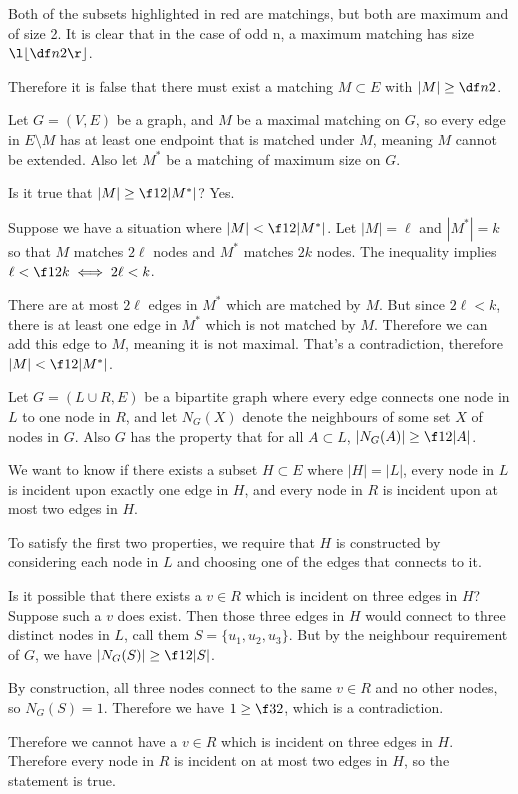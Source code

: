 \documentclass[a4paper]{article}
\begin{document}
Both of the subsets highlighted in red are matchings, but both are maximum and of size 2. It is clear that in the case of odd n, a maximum matching has size $\l\lfloor \df n2 \r\rfloor$.

Therefore it is false that there must exist a matching $M \subset E$ with $|M| \ge \df n2$.


\newpage
{}

Let $G = (V, E)$ be a graph, and $M$ be a maximal matching on $G$, so every edge in $E \setminus M$ has at least one endpoint that is matched under $M$, meaning $M$ cannot be extended. Also let $M^*$ be a matching of maximum size on $G$.

Is it true that $|M| \ge \f12 |M^*|$? Yes.

Suppose we have a situation where $|M| < \f12 |M^*|$. Let $|M| = \ell$ and $|M^*| = k$ so that $M$ matches $2\ell$ nodes and $M^*$ matches $2k$ nodes. The inequality implies $\ell < \f12 k \iff 2\ell < k$.

There are at most $2\ell$ edges in $M^*$ which are matched by $M$. But since $2\ell < k$, there is at least one edge in $M^*$ which is not matched by $M$. Therefore we can add this edge to $M$, meaning it is not maximal. That's a contradiction, therefore $|M| < \f12 |M^*|$.


\newpage
{}

Let $G = (L \cup R, E)$ be a bipartite graph where every edge connects one node in $L$ to one node in $R$, and let $N_G(X)$ denote the neighbours of some set $X$ of nodes in $G$. Also $G$ has the property that for all $A \subset L$, $|N_G(A)| \ge \f12 |A|$.

We want to know if there exists a subset $H \subset E$ where $|H| = |L|$, every node in $L$ is incident upon exactly one edge in $H$, and every node in $R$ is incident upon at most two edges in $H$.

To satisfy the first two properties, we require that $H$ is constructed by considering each node in $L$ and choosing one of the edges that connects to it.

Is it possible that there exists a $v \in R$ which is incident on three edges in $H$? Suppose such a $v$ does exist. Then those three edges in $H$ would connect to three distinct nodes in $L$, call them $S = \{u_1, u_2, u_3\}$. But by the neighbour requirement of $G$, we have $|N_G(S)| \ge \f12 |S|$.

By construction, all three nodes connect to the same $v \in R$ and no other nodes, so $N_G(S) = 1$. Therefore we have $1 \ge \f32$, which is a contradiction.

Therefore we cannot have a $v \in R$ which is incident on three edges in $H$. Therefore every node in $R$ is incident on at most two edges in $H$, so the statement is true.

\end{document}
